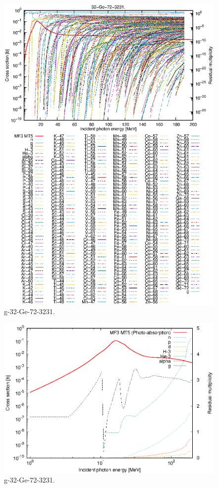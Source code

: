 \begin{figure}
 \includegraphics[width=\linewidth]{eps/g_32-Ge-72_3231.eps}
  \caption{g-32-Ge-72-3231.}
\end{figure}
\newpage \clearpage

\begin{figure}
 \includegraphics[width=\linewidth]{eps-log/g_32-Ge-72_3231.eps}
 \caption{g-32-Ge-72-3231.}
\end{figure}
\newpage \clearpage


